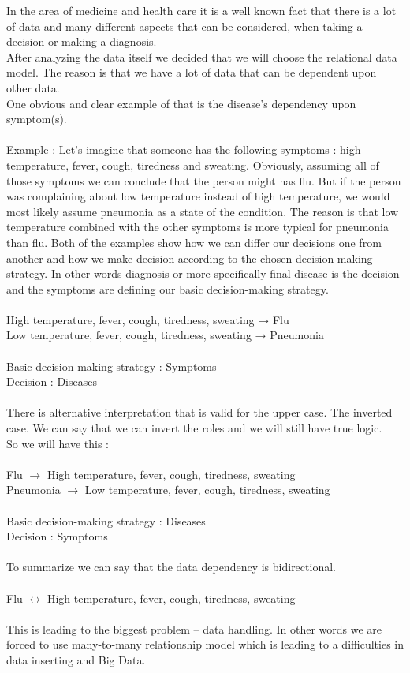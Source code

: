 In the area of medicine and health care it is a well known fact that there is a lot of data and many different aspects that can be considered, when taking a decision or making a diagnosis. \\
After analyzing the data itself we decided that we will choose the relational data model.
The reason is that we have a lot of data that can be dependent upon other data.\\
One obvious and clear example of that is the disease’s dependency upon symptom(s).\\
\\
Example : 
Let’s imagine that someone has the following symptoms : high temperature, fever, cough, tiredness and sweating. 
Obviously, assuming all of those symptoms we can conclude that the person might has flu. But if the person was complaining about low temperature instead of high temperature, we would most likely assume pneumonia as a state of the condition. The reason is that low temperature combined with the other symptoms is more typical for pneumonia than flu. 
Both of the examples show how we can differ our decisions one from another and how we make decision according to the chosen decision-making strategy. In other words diagnosis or more specifically final disease is the decision and the symptoms are defining our basic decision-making strategy.\\
\\
High temperature, fever, cough, tiredness, sweating → Flu\\
Low temperature, fever, cough, tiredness, sweating → Pneumonia\\
\\
Basic decision-making strategy : Symptoms\\
Decision : Diseases\\
\\
There is alternative interpretation that is valid for the upper case. The inverted case.
We can say that we can invert the roles and we will still have true logic.\\  
So we will have this :\\
\\
Flu $\rightarrow$ High temperature, fever, cough, tiredness, sweating \\
Pneumonia 		$\rightarrow$	  Low temperature, fever, cough, tiredness, sweating\\
\\
Basic decision-making strategy : Diseases\\
Decision : Symptoms\\
\\
To summarize we can say that the data dependency is bidirectional.\\
\\
Flu $\leftrightarrow$ High temperature, fever, cough, tiredness, sweating\\
\\
This is leading to the biggest problem – data handling.
In other words  we are forced to use many-to-many relationship model which is leading to a difficulties in data inserting and Big Data.

